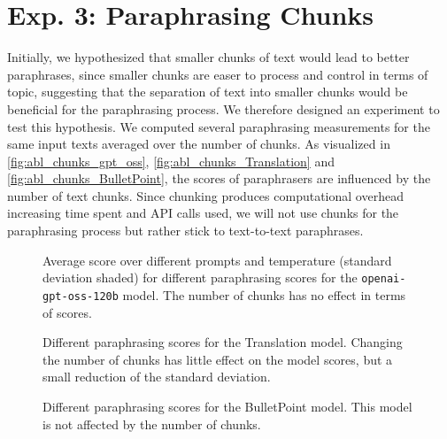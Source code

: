 \section{Exp. 3: Paraphrasing Chunks}

Initially, we hypothesized that smaller chunks of text would lead to better paraphrases, since smaller chunks are easer to process and control in terms of topic, suggesting that the separation of text into smaller chunks would be beneficial for the paraphrasing process.
We therefore designed an experiment to test this hypothesis.
We computed several paraphrasing measurements for the same input texts averaged over the number of chunks.
As visualized in \autoref{fig:abl_chunks_gpt_oss}, \autoref{fig:abl_chunks_Translation} and \autoref{fig:abl_chunks_BulletPoint},
the scores of paraphrasers are influenced by the number of text chunks.
Since chunking produces computational overhead increasing time spent and API calls used, we will not use chunks for the paraphrasing process but rather stick to text-to-text paraphrases.
 
\begin{figure}[htbp]
    \centering
    
    \caption{Average score over different prompts and temperature (standard deviation shaded) for different paraphrasing scores for the \texttt{openai-gpt-oss-120b} model.
    The number of chunks has no effect in terms of scores.}
    \label{fig:abl_chunks_gpt_oss}
\end{figure}

\begin{figure}[htbp]
    \centering
    
    \caption{Different paraphrasing scores for the Translation model. 
    Changing the number of chunks has little effect on the model scores, but a small reduction of the standard deviation.}
    \label{fig:abl_chunks_Translation}
\end{figure}

\begin{figure}[htbp]
    \centering
    
    \caption{Different paraphrasing scores for the BulletPoint model. 
    This model is not affected by the number of chunks.}
    \label{fig:abl_chunks_BulletPoint}
\end{figure}